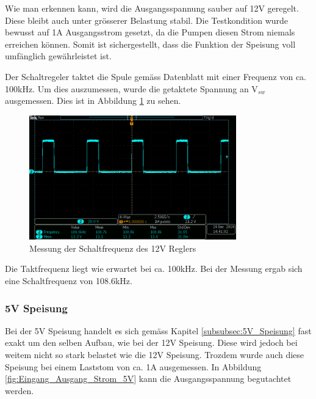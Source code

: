 Wie man erkennen kann, wird die Ausgangsspannung sauber auf 12V geregelt. Diese bleibt auch unter grösserer Belastung stabil. Die Testkondition wurde bewusst auf 1A Ausgangsstrom gesetzt, da die Pumpen diesen Strom niemals erreichen können. Somit ist sichergestellt, dass die Funktion der Speisung voll umfänglich gewährleistet ist.

Der Schaltregeler taktet die Spule gemäss Datenblatt mit einer Frequenz von ca. 100kHz. Um dies auszumessen, wurde die getaktete Spannung an V$_{sw}$ ausgemessen. Dies ist in Abbildung \ref{fig:Taktfrequenz_12V} zu sehen. 

\begin{figure}[h!]
	\centering
	\includegraphics[width=0.8\textwidth]{graphics/Schaltfrequenz_SW_12V.png}
	\caption{Messung der Schaltfrequenz des 12V Reglers} 
	\label{fig:Taktfrequenz_12V}
\end{figure}

Die Taktfrequenz liegt wie erwartet bei ca. 100kHz. Bei der Messung ergab sich eine Schaltfrequenz von 108.6kHz.

\subsubsection{5V Speisung}\label{subsubsec:Hardware_Verifikation_5V_Speisunge}

Bei der 5V Speisung handelt es sich gemäss Kapitel \ref{subsubsec:5V_Speisung} fast exakt um den selben Aufbau, wie bei der 12V Speisung. Diese wird jedoch bei weitem nicht so stark belastet wie die 12V Speisung. Trozdem wurde auch diese Speisung bei einem Laststom von ca. 1A ausgemessen. In Abbildung \ref{fig:Eingang_Ausgang_Strom_5V} kann die Ausgangsspannung begutachtet werden.

